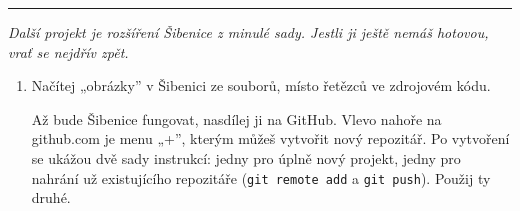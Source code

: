 \documentclass[a4paper,10pt]{article}
\newcommand\startsection[1]{
     \vspace{0.2ex}
    \hrule
    {\fontspec{Oxygen} \tiny
     \vspace{-1ex}
     \emph{#1}
     \vspace{-1.5em}
    }
}
\begin{document}
\startsection{Další projekt je rozšíření Šibenice z minulé sady. Jestli ji ještě
    nemáš hotovou, vrať se nejdřív zpět.}

\begin{enumerate}[resume]

\item
    Načítej „obrázky” v Šibenici ze souborů, místo řetězců ve zdrojovém kódu.

    Až bude Šibenice fungovat, nasdílej ji na GitHub.
    Vlevo nahoře na github.com je menu „+”, kterým můžeš vytvořit nový
    repozitář. Po vytvoření se ukážou dvě sady instrukcí: jedny pro úplně nový
    projekt, jedny pro nahrání už existujícího repozitáře
    (\texttt{git remote add} a \texttt{git push}).
    Použij ty druhé.

\end{enumerate}
\end{document}
